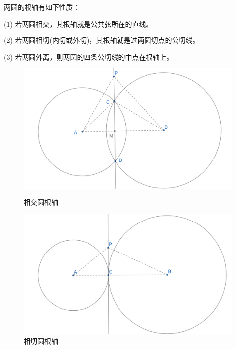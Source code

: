 \begin{proposition}[根轴性质]
    两圆的根轴有如下性质：
    
    (1) 若两圆相交，其根轴就是公共弦所在的直线。
    
    (2) 若两圆相切(内切或外切)，其根轴就是过两圆切点的公切线。
    
    (3) 若两圆外离，则两圆的四条公切线的中点在根轴上。
\end{proposition}
\begin{figure}[H]
    \centering
    \hfill %
    \begin{minipage}[t]{0.3\textwidth}
        \centering
        \includegraphics[width=\linewidth]{figures/相交圆根轴.png}
        \caption{相交圆根轴}
    \end{minipage}
    \hfill %
    \begin{minipage}[t]{0.3\textwidth}
    \centering
    \includegraphics[width=\linewidth]{figures/相切圆根轴.png}
    \caption{相切圆根轴}
    \end{minipage}
    \begin{minipage}[t]{0.3\textwidth}

\end{minipage}
\end{figure}
